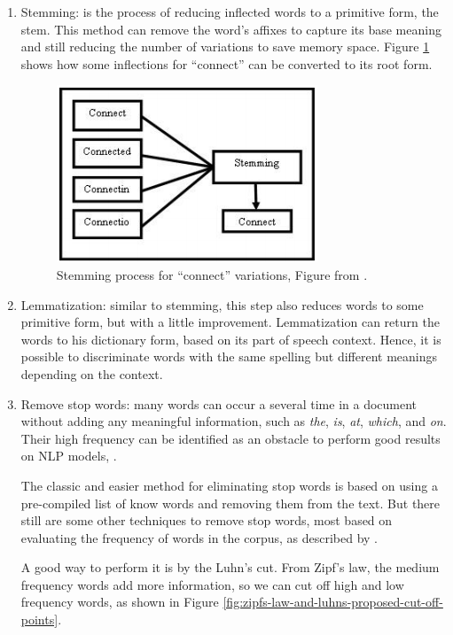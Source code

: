 	\begin{enumerate}
		\item Stemming: is the process of reducing inflected words to a primitive form, the stem. This method can remove the word's affixes to capture its base meaning and still reducing the number of variations to save memory space. Figure \ref{fig:stemming} shows how some inflections for ``connect'' can be converted to its root form.
		
		\begin{figure}[h!]
			\centering
			\includegraphics[width=0.5\linewidth]{01.Chapters/02.Background/stemming}
			\caption{Stemming process for ``connect'' variations, Figure from  \cite{vijayarani2015preprocessing}.}
			\label{fig:stemming}
		\end{figure}
		
		
		\item Lemmatization: similar to stemming, this step also reduces words to some primitive form, but with a little improvement. Lemmatization can return the words to his dictionary form, based on its part of speech context. Hence, it is possible to discriminate words with the same spelling but different meanings depending on the context. 	
				
		\item Remove stop words:
		many words can occur a several time in a document without adding any meaningful information, such as \textit{the}, \textit{is}, \textit{at}, \textit{which}, and \textit{on}. Their high frequency can be identified as an obstacle to perform good results on NLP models, \cite{kannan2014preprocessing}. 
		
		The classic and easier method for eliminating stop words is based on using a pre-compiled list of know words and removing them from the text.
		But there still are some other techniques to remove stop words, most based on evaluating the frequency of words in the corpus, as described by \cite{vijayarani2015preprocessing}. 

		A good way to perform it is by the Luhn's cut. From Zipf's law, the medium frequency words add more information, so we can cut off high and low frequency words, as shown in Figure \ref{fig:zipfs-law-and-luhns-proposed-cut-off-points}.
		

\end{enumerate}
